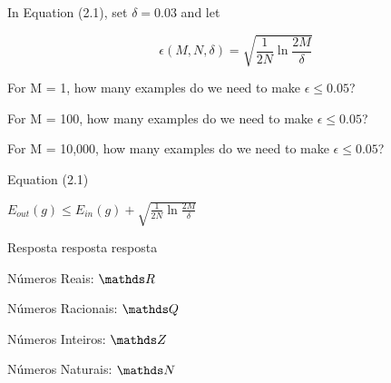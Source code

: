 \begin{enunciado}{1}
    In Equation (2.1), set $\delta = 0.03$ and let
    
    $$ \epsilon(M, N, \delta) = \sqrt{\frac{1}{2N} \ln{\frac{2M}{\delta}}}$$
    
     For M = 1, how many examples do we need to make $\epsilon \le 0.05$?
    
     For M = 100, how many examples do we need to make $\epsilon \le 0.05$?
    
     For M = 10,000, how many examples do we need to make $\epsilon \le 0.05$?
    
    \begin{grayt}
    Equation (2.1) %
    
    $ E_{out}(g) \leq E_{in}(g) + \sqrt{\frac{1}{2N} \ln{\frac{2M}{\delta}}} $
    \end{grayt}
    
\end{enunciado}

Resposta resposta resposta

Números Reais: $\conjR$

Números Racionais: $\conjQ$

Números Inteiros: $\conjZ$

Números Naturais: $\conjN$

